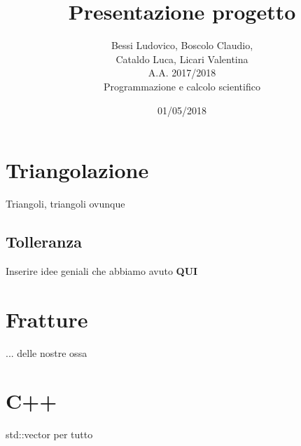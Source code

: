 \documentclass[11pt, a4paper]{article}
\begin{document}
\author{Bessi Ludovico, Boscolo Claudio,\\ Cataldo Luca, Licari Valentina\\ A.A. 2017/2018\\Programmazione e calcolo scientifico}
\title{Presentazione progetto\\}
\date{01/05/2018}
\maketitle
\tableofcontents
\newpage

\section{Triangolazione}
Triangoli, triangoli ovunque
\subsection{Tolleranza}
Inserire idee geniali che abbiamo avuto \textbf{QUI}




\section{Fratture}
... delle nostre ossa


\section{C++}
std::vector per tutto
\end{document}
